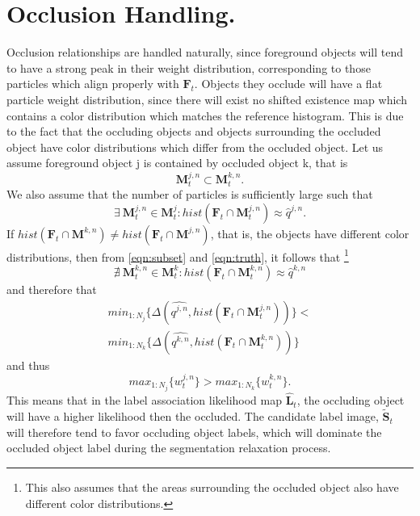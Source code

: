 \section{Occlusion Handling.}
Occlusion relationships are handled naturally, since foreground objects will tend to have a strong peak in their weight distribution, corresponding to those particles which align properly with $\mathbf{F}_t$. Objects they occlude will have a flat particle weight distribution, since there will exist no shifted existence map which contains a color distribution which matches the reference histogram. This is due to the fact that the occluding objects and objects surrounding the occluded object have color distributions which differ from the occluded object. Let us assume foreground object j is contained by occluded object k, that is
\begin{equation}
\label{eqn:subset}
\mathbf{M}^{j,n}_t \subset \mathbf{M}^{k,n}_t .
\end{equation}
We also assume that the number of particles is sufficiently large such that
\begin{equation}
\label{eqn:truth}
\exists~\mathbf{M}^{j,n}_t \in \mathbf{M}^{j}_t : hist(\mathbf{F}_{t} \cap \mathbf{M}^{j,n}_t) \approx \hat{q}^{j,n}.
\end{equation}
If $hist(\mathbf{F}_{t} \cap \mathbf{M}^{k,n}) \neq hist(\mathbf{F}_{t} \cap \mathbf{M}^{j,n})$, that is, the objects have different color distributions, then from \eqref{eqn:subset} and \eqref{eqn:truth}, it follows that \footnote{This also assumes that the areas surrounding the occluded object also have different color distributions.}
\begin{equation}
\label{eqn:notruth}
\nexists~\mathbf{M}^{k,n}_t \in \mathbf{M}^{k}_t : hist(\mathbf{F}_{t} \cap \mathbf{M}^{k,n}_t) \approx \hat{q}^{k,n}
\end{equation}
and therefore that 
\begin{eqnarray}
min_{1:N_j} \{ \Delta(\hat{\mathit{q}^{j,n}},hist(\mathbf{F}_{t} \cap \mathbf{M}^{j,n}_t) )\} < \nonumber \\
min_{1:N_k} \{ \Delta(\hat{\mathit{q}^{k,n}},hist(\mathbf{F}_{t} \cap \mathbf{M}^{k,n}_t) )\}
\end{eqnarray}
and thus
\begin{equation}
max_{1:N_j}\{w^{j,n}_t\} > max_{1:N_k}\{w^{k,n}_t\}.
\end{equation}
This means that in the label association likelihood map $\hat{\mathbf{L}}_{t}$, the occluding object will have a higher likelihood then the occluded. The candidate label image, $\tilde{\mathbf{S}}_{t}$ will therefore tend to favor occluding object labels, which will dominate the occluded object label during the segmentation relaxation process.

